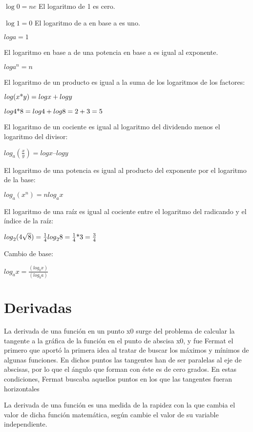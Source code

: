 \documentclass{article}
\newcommand\normalsubformula[1]{\text{\mathversion{normal}$#1$}}
\begin{document}
 $\log 0=\mathit{ne}$ \newline
El logaritmo de 1 es cero.

 $\log 1=0$ \newline
El logaritmo de a en base a es uno.

 $loga=1$

El logaritmo en base a de una potencia en base a es igual al exponente.

 $loga^{n}=n$

El logaritmo de un producto es igual a la suma de los logaritmos de los factores:

 $log(x\normalsubformula{\text{*}}y)=logx+logy$

 $log4\normalsubformula{\text{*}}8=log4+log8=2+3=5$

El logaritmo de un cociente es igual al logaritmo del dividendo menos el logaritmo del divisor:

 ${log}_{a}(\frac{x}{y})=logx\text{--}logy$

El logaritmo de una potencia es igual al producto del exponente por el logaritmo de la base:

 ${log}_{a}(x^{n})={nlog}_{a}x$

El logaritmo de una ra\'iz es igual al cociente entre el logaritmo del radicando y el \'indice de la ra\'iz:

 ${log}_{2}(4\sqrt{8})=\frac{1}{4}{log}_{2}8=\frac{1}{4}\normalsubformula{\text{*}}3=\frac{3}{4}$

Cambio de base:

 ${log}_{a}x=\frac{({log}_{b}x)}{({log}_{b}a)}$


\bigskip

\section[Derivadas]{Derivadas}

La derivada de una funci\'on en un punto x0 surge del problema de calcular la tangente a la gr\'afica de la funci\'on en el punto de abscisa x0, y fue Fermat el primero que aport\'o la primera idea al tratar de buscar los m\'aximos y m\'inimos de algunas funciones. En dichos puntos las tangentes han de ser paralelas al eje de abscisas, por lo que el \'angulo que forman con \'este es de cero grados. En estas condiciones, Fermat buscaba aquellos puntos en los que las tangentes fueran horizontales

La derivada de una funci\'on es una medida de la rapidez con la que cambia el valor de dicha funci\'on matem\'atica, seg\'un cambie el valor de su variable independiente.
\end{document}
